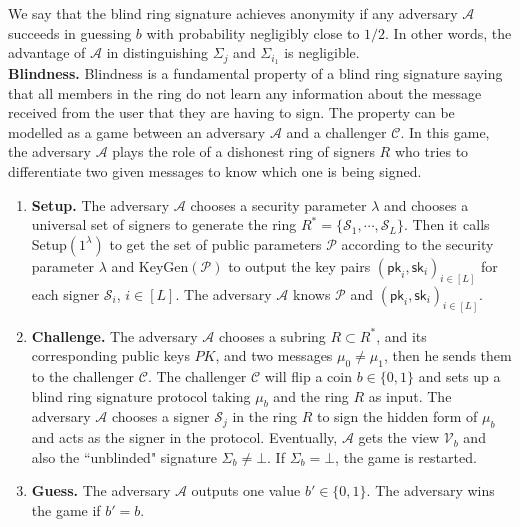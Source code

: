 \documentclass[runningheads]{llncs}
\begin{document}
We say that the blind ring signature achieves anonymity if any adversary $\mathcal{A}$ succeeds in guessing $b$ with probability negligibly close to $1/2$. In other words, the advantage of $\mathcal{A}$ in distinguishing $\Sigma_{j}$ and $\Sigma_{i_1}$ is negligible.\\

\noindent \textbf{Blindness.} \label{blind}
Blindness is a fundamental property of a blind ring signature saying that all members in the ring do not learn any information about the message received from the user that they are having to sign. 
The property can be modelled as a game  between an adversary $\mathcal{A}$ and a challenger $\mathcal{C}$. In this game, the adversary $\mathcal{A}$ plays the role of a dishonest ring of signers $R$ who tries to differentiate two given messages to know which one is being signed. 

\begin{enumerate}
	\item  \textbf{Setup.} The adversary $\mathcal{A}$ chooses a security parameter $\lambda$ and chooses a universal set of signers to generate the ring $R^{*}=\{\mathcal{S}_1, \cdots, \mathcal{S}_L \}$. Then it calls \textsf{Setup}$(1^{\lambda})$ to get the set of public parameters $\mathcal{P}$ according to the security parameter $\lambda$ and  \textsf{KeyGen}$(\mathcal{P})$ to output the key pairs $(\mathsf{pk}_i, \mathsf{sk}_i)_{i\in [L]}$ for each signer $\mathcal{S}_i$, $i \in [L]$. The adversary $\mathcal{A}$ knows $\mathcal{P}$ and $(\mathsf{pk}_i, \mathsf{sk}_i)_{i\in [L]}$. 
	\item \textbf{Challenge.} The adversary $\mathcal{A}$ chooses a subring $R \subset R^{*}$, and its corresponding  public keys $PK$, and two messages $\mu_0 \neq \mu_1$, then he sends them to the challenger $\mathcal{C}$. The challenger $\mathcal{C}$ will flip a coin $b \in \{0, 1\}$ and sets up a blind ring signature protocol taking $\mu_b$ and the ring $R$ as input. The adversary $\mathcal{A}$ chooses a signer $\mathcal{S}_j$ in the ring $R$ to sign  the hidden form of $\mu_b$ and acts as the signer in the protocol. Eventually, $\mathcal{A}$ gets the view $\mathcal{V}_b$ and also the ``unblinded" signature $\Sigma_b \neq \bot$. If $\Sigma_b =\bot$, the game is restarted.
	\item \textbf{Guess.} The adversary $\mathcal{A}$ outputs one value $b' \in \{0,1\}$. The adversary wins the game if $b'=b$.
	
\end{enumerate}
\end{document}
